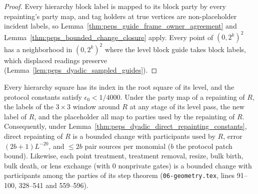 \begin{proof}\leanok
    Every hierarchy block label is mapped to its block party by every repainting's party map, and tag holders at true vertices are non-placeholder incident labels, so Lemma~\ref{thm:peps_guide_frame_owner_agreement} and Lemma~\ref{thm:peps_bounded_change_closure} apply. Every point of $(0,2^k)^2$ has a neighborhood in $(0,2^k)^2$ where the level block guide takes block labels, which displaced readings preserve (Lemma~\ref{lem:peps_dyadic_sampled_guides}).
\end{proof}

\begin{lemma}
    \label{thm:peps_protocol_bounded_changes}
    \leanok
    Every hierarchy square has its index in the root square of its level, and the protocol constants satisfy $\epsilon_0<1/4000$. Under the party map of a repainting of $R$, the labels of the $3\times3$ window around $R$ at any stage of its level pass, the new label of $R$, and the placeholder all map to parties used by the repainting of $R$. Consequently, under Lemma~\ref{thm:peps_dyadic_direct_repainting_constants}, direct repainting of $R$ is a bounded change with participants used by $R$, error $(2b+1)L^{-20}$, and $\le 2b$ pair sources per monomial ($b$ the protocol patch bound). Likewise, each point treatment, treatment removal, resize, bulk birth, bulk death, or lens exchange (with $0$ nonprivate gates) is a bounded change with participants among the parties of its step theorem (\texttt{06-geometry.tex}, lines 91--100, 328--541 and 559--596).
\end{lemma}

